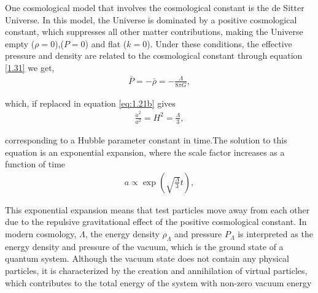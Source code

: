 One cosmological model that involves the cosmological constant is the de Sitter Universe. In this model, the Universe is dominated by a positive cosmological constant, which suppresses all other matter contributions, making the Universe empty ($\rho=0$),($P = 0$) and flat ($k=0$). Under these conditions, the effective pressure and density are related to the cosmological constant through equation \ref{1.31} we get,
\begin{align}
   \bar{P}=-\bar{\rho}=-\frac{\Lambda}{8 \pi G}, \label{1.32}
\end{align}

which, if replaced in equation \ref{eq:1.21b} gives
\begin{align}
    \frac{\dot{a}^2}{a^2}=H^2=\frac{\Lambda}{3},\label{1.33}
\end{align}

corresponding to a Hubble parameter constant in time.The solution to
this equation is an exponential expansion, where the scale factor increases as a function of time
\begin{align}
    a \propto \exp \left(\sqrt{\frac{\Lambda}{3}} t\right),\label{1.34}
\end{align}


This exponential expansion means that test particles move away from
each other due to the repulsive gravitational effect of the positive cosmological constant.
In modern cosmology, $\Lambda$, the energy density $\rho_{\Lambda}$ and pressure $P_{\Lambda}$ is interpreted as the energy density and pressure of the vacuum, which is the ground state of a quantum system. Although the vacuum state does not
contain any physical particles, it is characterized by the creation and annihilation of virtual particles, which contributes to the total energy of the system with non-zero vacuum energy









